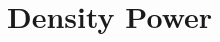 \documentclass[twocolumn,superscriptaddress,prd]{revtex4}
\begin{document}

\section{Density Power}
\label{sec:Density}
\end{document}
